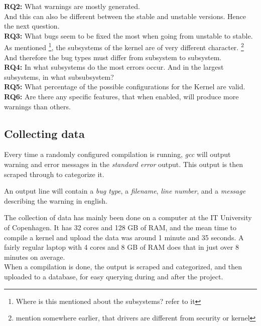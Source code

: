 \documentclass[a4paper,11pt]{article}
\begin{document}
\textbf{RQ2:} What warnings are mostly generated.  
\\


And this can also be different between the stable and unstable versions. Hence 
the next question. 
\\


\textbf{RQ3:} What bugs seem to be fixed the most when going from unstable to 
stable. 
\\


As mentioned \footnote{Where is this mentioned about the subsystems? refer to 
it}, the subsystems of the kernel are of very different character. 
\footnote{mention somewhere earlier, that drivers are different from security 
or kernel} And therefore the bug types must differ from subsystem to subsystem. 
\\


\textbf{RQ4:} In what subsystems do the most errors occur. And in the largest 
subsystems, in what subsubsystem? 
\\


\textbf{RQ5:} What percentage of the possible configurations for the Kernel are 
valid. 
\\


\textbf{RQ6:} Are there any specific features, that when enabled, will produce 
more warnings than others. 
\\




\subsection{Collecting data}

Every time a randomly configured compilation is running, \emph{gcc} will 
output warning and error messages in the \emph{standard error} output. This 
output is then scraped through to categorize it.

An output line will contain a \emph{bug type}, a \emph{filename}, \emph{line 
number}, and a \emph{message} describing the warning in english.


The collection of data has mainly been done on a computer at the IT University 
of Copenhagen. It has 32 cores and 128 GB of RAM, and the mean time to compile 
a kernel and upload the data was around 1 minute and 35 seconds. A fairly 
regular laptop with 4 cores and 8 GB of RAM does that in just over 8 minutes 
on average. 
\\


When a compilation is done, the output is scraped and categorized, and then 
uploaded to a database, for easy querying during and after the project. 
\end{document}
